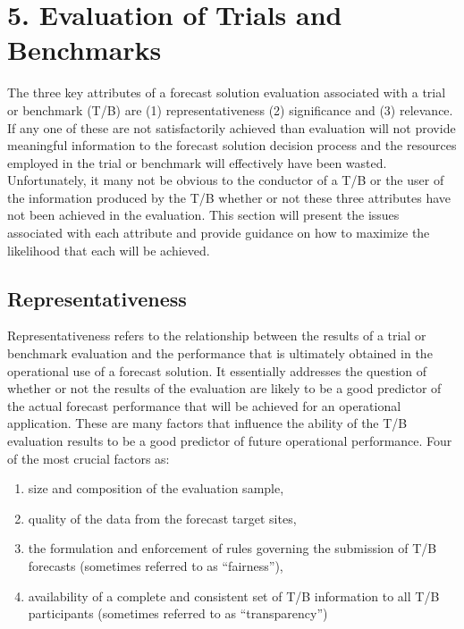 \chapter{5. Evaluation of Trials and Benchmarks}\label{ch:trialevaluation}
The three key attributes of a forecast solution evaluation associated with a trial or benchmark (T/B) are (1) representativeness (2) significance and (3) relevance.  If any one of these are not satisfactorily achieved than evaluation will not provide meaningful information to the forecast solution decision process and the resources employed in the trial or benchmark will effectively have been wasted.  Unfortunately, it many not be obvious to the conductor of a T/B or the user of the information produced by the T/B whether or not these three attributes have not been achieved in the evaluation.  This section will present the issues associated with each attribute and provide guidance on how to maximize the likelihood that each will be achieved. 

\section{Representativeness} %

Representativeness refers to the relationship between the results of a trial or benchmark evaluation and the performance that is ultimately obtained in the operational use of a forecast solution.  It essentially addresses the question of whether or not the results of the evaluation are likely to be a good predictor of the actual forecast performance that will be achieved for an operational application. These are many factors that influence the ability of the T/B evaluation results to be a good predictor of future operational performance. Four of the most crucial factors as: 
\begin{enumerate}
\item size and composition of the evaluation sample,
\item quality of the data from the forecast target sites,
\item the formulation and enforcement of rules governing the submission of T/B forecasts (sometimes referred to as “fairness”),
\item availability of a complete and consistent set of T/B information to all T/B participants (sometimes referred to as “transparency”)
\end{enumerate}

